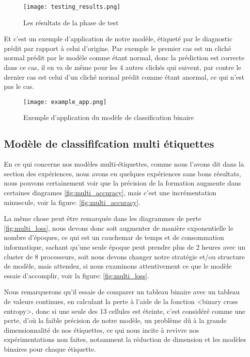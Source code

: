         \begin{figure}[H]
            \centering
            \texttt{[image: testing\_results.png]}
            \caption{Les résultats de la phase de test}\label{fig:testing_results}
        \end{figure}
        Et c'est un exemple d'application de notre modèle, étiqueté par le diagnostic prédit par rapport à celui d'origine.
        Par exemple le premier cas est un cliché normal prédit par le modèle comme étant normal, donc la prédiction est correcte dans ce cas, il en va de même pour les 4 autres clichés qui suivent, par contre le dernier cas est celui d'un cliché normal prédit comme étant anormal, ce qui n'est pas le cas.
        \begin{figure}[H]
            \centering
            \texttt{[image: example\_app.png]}
            \caption{Exemple d’application du modèle de classification binaire}\label{fig:example_app}
        \end{figure}
    \subsection{Modèle de classififcation multi étiquettes}

        En ce qui concerne nos modèles multi-étiquettes, comme nous l'avons dit dans la section des expériences, nous avons eu quelques expériences sans bons résultats, nous pouvons certainement voir que la précision de la formation augmente dans certaines diagrames \ref{fig:multi_accuracy}, mais c'est une incrémentation minuscule, voir la figure: \ref{fig:multi_accuracy}.

        La même chose peut être remarquée dans les diagrammes de perte \ref{fig:multi_loss}, nous devons donc soit augmenter de manière exponentielle le nombre d'époques, ce qui est un cauchemar de temps et de consommation informatique, sachant qu'une seule époque peut prendre plus de 2 heures avec un cluster de 8 processeurs, soit nous devons changer notre stratégie et/ou structure de modèle, mais attendez, si nous examinons attentivement ce que le modèle essaie d'accomplir, voir la figure: \ref{fig:multi_loss}.

        Nous remarquerons qu'il essaie de comparer un tableau binaire avec un tableau de valeurs continues, en calculant la perte à l'aide de la fonction <binary cross entropy>, donc si une seule des 13 cellules est éteinte, c'est considéré comme une perte, d'où la faible précision de notre modèle, un problème dû à la grande dimensionnalité de nos étiquettes, ce qui nous incite à revivre nos expérimentations non faites, notamment la réduction de dimension et les modèles binaires pour chaque étiquette.
        
